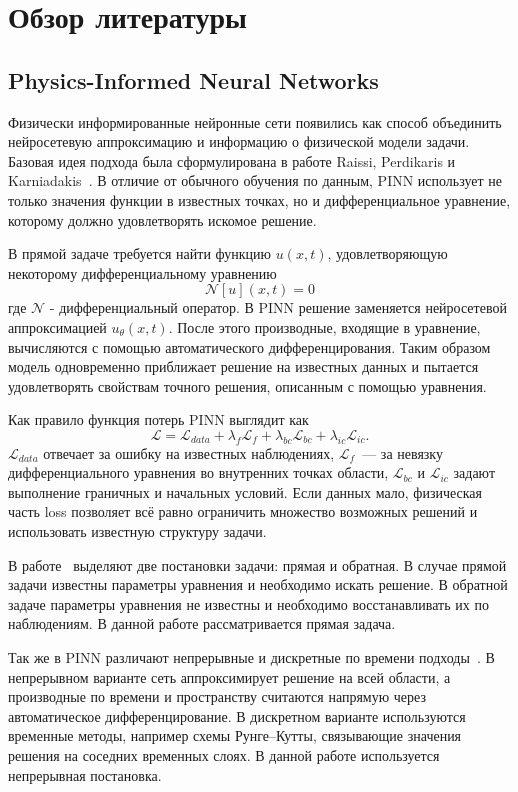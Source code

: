 \documentclass[14pt,a4paper]{extarticle}
\begin{document}
\section{Обзор литературы}

\subsection{Physics-Informed Neural Networks}

Физически информированные нейронные сети появились как способ объединить нейросетевую аппроксимацию и информацию о физической модели задачи. Базовая идея подхода была сформулирована в работе Raissi, Perdikaris и Karniadakis~\cite{raissi2019physics}. В отличие от обычного обучения по данным, PINN использует не только значения функции в известных точках, но и дифференциальное уравнение, которому должно удовлетворять искомое решение.

В прямой задаче требуется найти функцию $u(x,t)$, удовлетворяющую некоторому дифференциальному уравнению
\[
    \mathcal{N}[u](x,t)=0
\]
где $\mathcal{N}$ -  дифференциальный оператор. В PINN решение заменяется нейросетевой аппроксимацией $u_\theta(x,t)$. После этого производные, входящие в уравнение, вычисляются с помощью автоматического дифференцирования. Таким образом модель одновременно приближает решение на известных данных и пытается удовлетворять свойствам точного решения, описанным с помощью уравнения.

Как правило функция потерь PINN выглядит как
\[
    \mathcal{L}
    =
    \mathcal{L}_{data}
    +
    \lambda_f \mathcal{L}_{f}
    +
    \lambda_{bc}\mathcal{L}_{bc}
    +
    \lambda_{ic}\mathcal{L}_{ic}.
\]
$\mathcal{L}_{data}$ отвечает за ошибку на известных наблюдениях, $\mathcal{L}_{f}$~--- за невязку дифференциального уравнения во внутренних точках области, $\mathcal{L}_{bc}$ и $\mathcal{L}_{ic}$ задают выполнение граничных и начальных условий. Если данных мало, физическая часть loss позволяет всё равно ограничить множество возможных решений и использовать известную структуру задачи.

В работе~\cite{raissi2019physics} выделяют две постановки задачи: прямая и обратная. В случае прямой задачи известны параметры уравнения и необходимо искать решение. В обратной задаче параметры уравнения не известны и необходимо восстанавливать их по наблюдениям. В данной работе рассматривается прямая задача. 

Так же в PINN различают непрерывные и дискретные по времени подходы~\cite{raissi2019physics}. В непрерывном варианте сеть аппроксимирует решение на всей области, а производные по времени и пространству считаются напрямую через автоматическое дифференцирование. В дискретном варианте используются временные методы, например схемы Рунге--Кутты, связывающие значения решения на соседних временных слоях. В данной работе используется непрерывная постановка.
\end{document}
